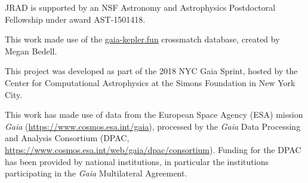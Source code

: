 \documentclass[preprint2]{aastex62}
\newcommand{\Kepler}{\textsl{Kepler}\xspace}
\begin{document}
%



\acknowledgments

JRAD is supported by an NSF Astronomy and Astrophysics Postdoctoral Fellowship under award AST-1501418. 

This work made use of the \url{gaia-kepler.fun} crossmatch database, created by Megan Bedell.

This project was developed as part of the 2018 NYC Gaia Sprint, hosted by the Center for Computational Astrophysics at the Simons Foundation in New York City.


This work has made use of data from the European Space Agency (ESA) mission
{\it Gaia} (\url{https://www.cosmos.esa.int/gaia}), processed by the {\it Gaia}
Data Processing and Analysis Consortium (DPAC,
\url{https://www.cosmos.esa.int/web/gaia/dpac/consortium}). Funding for the DPAC
has been provided by national institutions, in particular the institutions
participating in the {\it Gaia} Multilateral Agreement.




\end{document}
